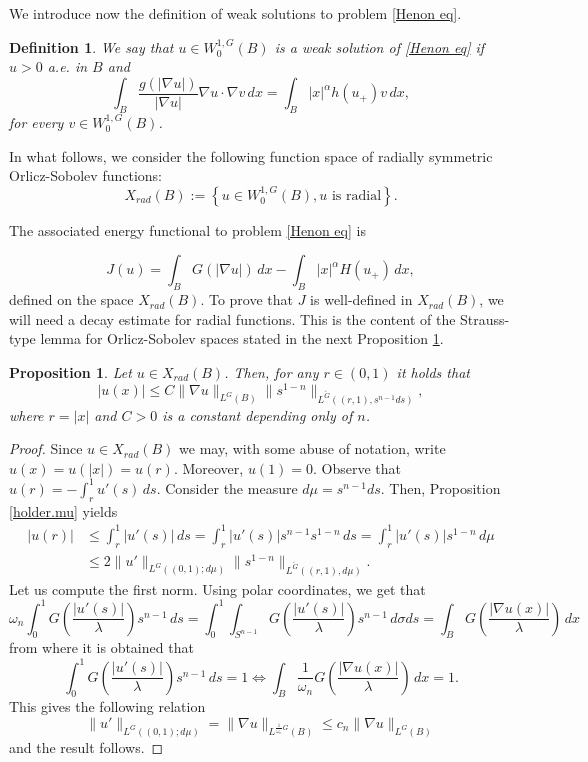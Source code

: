 \documentclass[leqno,twoside, 12pt]{amsart}
\theoremstyle{plain}
\numberwithin{equation}{section} \numberwithin{figure}{section}
\newtheorem{proposition}[theorem]{Proposition}
\newtheorem{definition}[theorem]{Definition}
\theoremstyle{definition}
\numberwithin{equation}{section}
\begin{document}
We introduce now the definition of weak solutions to problem \eqref{Henon eq}.

\begin{definition}\label{defi wk sol} We say that $u\in W_0^{1, G}(B)$ is a weak solution of \eqref{Henon eq} if  $u>0$ a.e. in $B$ and
$$
\int_B \dfrac{g(|\nabla u|)}{|\nabla u|}\nabla u \cdot \nabla v\,dx = \int_B|x|^\alpha h( u_{+}) v\,dx,
$$
for every $v\in W_{0}^{1, G}(B)$. 
\end{definition}


 In what follows, we consider the following function space of radially symmetric Orlicz-Sobolev functions:
$$X_{rad}(B):=\left\lbrace u \in W_0^{1, G}(B), u \text{ is radial} \right\rbrace.$$

The associated energy functional to problem \eqref{Henon eq} is

$$
J(u)= \int_B G(|\nabla u|)\,dx -  \int_B |x|^\alpha H( u_{+})\,dx,
$$
defined on the space $X_{rad}(B)$. To prove that $J$ is well-defined in $X_{rad}(B)$, we will need a  decay estimate for radial functions. This is the content of the Strauss-type lemma for Orlicz-Sobolev spaces stated in the next Proposition \ref{strauss.nuevo}.




\begin{proposition} \label{strauss.nuevo}
Let $u\in X_{rad}(B)$. Then, for any $r\in (0,1)$ it holds that
$$
|u(x)| \leq C
\| \nabla u\|_{L^{G}(B)} \|s^{1-n}\|_{L^{\widetilde G}((r,1),s^{n-1}ds)},
$$
where $r=|x|$ and $C>0$ is a constant depending only of $n$.
\end{proposition}
 
 
\begin{proof}
Since $u\in X_{rad}(B)$ we may, with some abuse of notation, write $u(x)=u(|x|)=u(r)$. Moreover, $u(1)=0$.    Observe that $u(r)=-\int_r^1 u'(s)\,ds$. Consider the measure $d\mu = s^{n-1}ds$. Then, Proposition \ref{holder.mu} yields
\begin{align*}
|u(r)|&\leq \int_r^1 |u'(s)|\,ds  = \int_r^1 |u'(s)| s^{n-1} s^{1-n}\,ds=\int_r^1 |u'(s)|  s^{1-n}\,d\mu\\
&\leq 2 \| u'\|_{L^G((0,1); d\mu)} \|s^{1-n}\|_{L^{\widetilde G}((r,1),d\mu)}.
\end{align*}
Let us compute the first norm. 
Using polar coordinates, we get that
$$
\omega_n\int_0^1 G\left(\frac{|u'(s)|}{\lambda}\right)s^{n-1}\,ds = \int_0^1 \int_{S^{n-1}} G\left(\frac{|u'(s)|}{\lambda}\right)s^{n-1}\, d\sigma ds = \int_B G\left(\frac{|\nabla u(x)|}{\lambda}\right)\,dx
$$
from where it is obtained that
$$
\int_0^1 G\left(\frac{|u'(s)|}{\lambda}\right)s^{n-1}\,ds = 1 \iff \int_B \frac{1}{\omega_n}G\left(\frac{|\nabla u(x)|}{\lambda}\right)\,dx =1.
$$
This gives the following relation
$$
 \| u'\|_{L^G((0,1); d\mu)} = \| \nabla u\|_{L^{\frac{1}{\omega_n}G}(B)} \leq  c_n \| \nabla u\|_{L^{G}(B)}
$$
and the result follows.
\end{proof}
\end{document}
